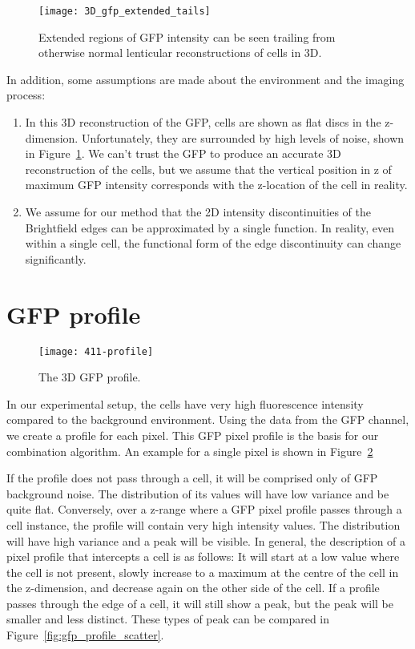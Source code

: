 \begin{figure}[htbp!]
\centering
\texttt{[image: 3D\_gfp\_extended\_tails]}
\caption[GFP 3D reconstruction]{Extended regions of GFP intensity can be seen trailing from otherwise normal lenticular reconstructions of cells in 3D.}
\label{fig:gfp_3d_recon}
\end{figure}

In addition, some assumptions are made about the environment and the imaging process:
\begin{enumerate}
\item In this 3D reconstruction of the GFP, cells are shown as flat discs in the z-dimension. Unfortunately, they are surrounded by high levels of noise, shown in Figure~\ref{fig:gfp_3d_recon}. We can't trust the GFP to produce an accurate 3D reconstruction of the cells, but we assume that the vertical position in z of maximum GFP intensity corresponds with the z-location of the cell in reality.
\item We assume for our method that the 2D intensity discontinuities of the Brightfield edges can be approximated by a single function. In reality, even within a single cell, the functional form of the edge discontinuity can change significantly.
\end{enumerate}

\section{GFP profile}

\begin{figure}[htbp!]
\centering
\texttt{[image: 411-profile]}
\caption[GFP profile]{The 3D GFP profile.}
\label{fig:3D_gfp_profile}
\end{figure}

In our experimental setup, the cells have very high fluorescence intensity compared to the background environment. Using the data from the GFP channel, we create a profile for each pixel. This GFP pixel profile is the basis for our combination algorithm. An example for a single pixel is shown in Figure~\ref{fig:3D_gfp_profile}

If the profile does not pass through a cell, it will be comprised only of GFP background noise. The distribution of its values will have low variance and be quite flat. Conversely, over a z-range where a GFP pixel profile passes through a cell instance, the profile will contain very high intensity values. The distribution will have high variance and a peak will be visible. In general, the description of a pixel profile that intercepts a cell is as follows: It will start at a low value where the cell is not present, slowly increase to a maximum at the centre of the cell in the z-dimension, and decrease again on the other side of the cell. If a profile passes through the edge of a cell, it will still show a peak, but the peak will be smaller and less distinct. These types of peak can be compared in Figure~\ref{fig:gfp_profile_scatter}.

